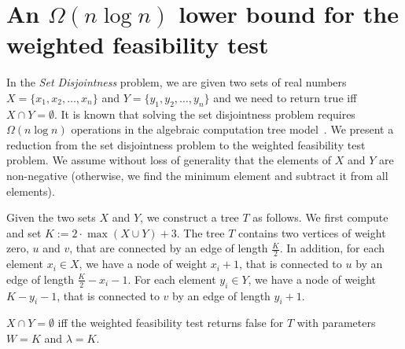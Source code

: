 \documentclass[a4paper,UKenglish]{lipics-v2016}
\theoremstyle{plain}
\begin{document}
\section{An \texorpdfstring{\boldmath$ \Omega (n\log n)$}{Omega(nlogn)} lower bound for the weighted feasibility test}\label{appendix weighted f.t. lower bound}

In the {\em Set Disjointness} problem, we are given two sets of real numbers $X=\lbrace x_1,x_2,\ldots,x_n \rbrace$ and $Y=\lbrace y_1,y_2,\ldots,y_n \rbrace$ and we need to return true iff $X \cap Y = \emptyset$. 
It is known that solving the set disjointness problem requires $\Omega(n \log n)$ operations in the algebraic
computation tree model~\cite{BenOr}.
We present a reduction from the set disjointness problem to the weighted feasibility test problem. We assume without loss of generality that the elements of $X$ and $Y$ are non-negative (otherwise,
we find the minimum element and subtract it from all elements).


Given the two sets $X$ and $Y$, we construct a tree $T$ as follows. We first compute and set
$K := 2 \cdot \max (X\cup Y) +3$.
The tree $T$ contains two vertices of weight zero, $u$ and $v$, that are connected by an edge of length $\frac{K}{2}$. In addition, for each element $x_i \in X$, we have a node of weight $x_i+1$, that is connected to $u$ by an edge of length $\frac{K}{2} - x_i -1$. For each element $y_i \in Y$, we have a node of weight $K - y_i -1$, that is connected to $v$ by an edge of length $y_i+1$.
\begin{lemma}\label{lemma of the reduction to set disjointness}
$X \cap Y = \emptyset$ iff the weighted feasibility test returns false for $T$ with  parameters $W=K$ and $\lambda =K$.
\end{lemma}
\end{document}

